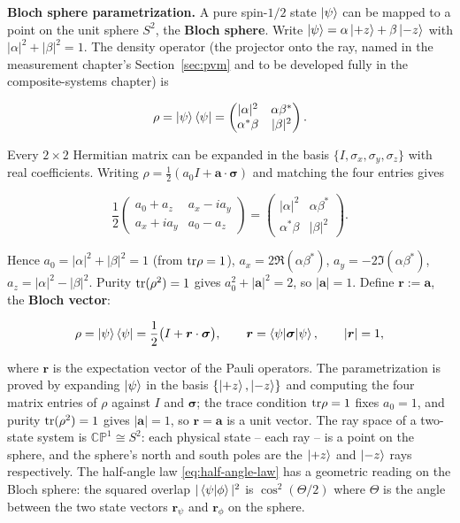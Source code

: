 \medskip\noindent\textbf{Bloch sphere parametrization.}
A pure spin-$1/2$ state $\ket{\psi}$ can be mapped to a point on the unit sphere $S^2$, the \textbf{Bloch sphere}. Write $\ket{\psi} = \alpha\ket{+z} + \beta\ket{-z}$ with $|\alpha|^2+|\beta|^2=1$. The density operator (the projector onto the ray, named in the measurement chapter's Section~\ref{sec:pvm} and to be developed fully in the composite-systems chapter) is
\begin{linenomath}
\begin{equation*}
\rho = \ket{\psi}\bra{\psi}
= \begin{pmatrix}
    |\alpha|^2 & \alpha\beta^* \\
    \alpha^*\beta & |\beta|^2
  \end{pmatrix}.
\end{equation*}
\end{linenomath}
Every $2\times2$ Hermitian matrix can be expanded in the basis $\{I,\sigma_x,\sigma_y,\sigma_z\}$ with real coefficients. Writing $\rho = \frac12(a_0 I + \bm a\cdot\bm\sigma)$ and matching the four entries gives
\begin{linenomath}
\begin{equation*}
\frac12\begin{pmatrix} a_0 + a_z & a_x - i a_y \\ a_x + i a_y & a_0 - a_z \end{pmatrix}
= \begin{pmatrix} |\alpha|^2 & \alpha\beta^* \\ \alpha^*\beta & |\beta|^2 \end{pmatrix}.
\end{equation*}
\end{linenomath}
Hence $a_0 = |\alpha|^2+|\beta|^2 = 1$ (from $\mathrm{tr}\rho=1$), $a_x = 2\Re(\alpha\beta^*)$, $a_y = -2\Im(\alpha\beta^*)$, $a_z = |\alpha|^2-|\beta|^2$. Purity $\mathrm{tr}(\rho^2)=1$ gives $a_0^2 + |\bm a|^2 = 2$, so $|\bm a|=1$. Define $\bm r := \bm a$, the \textbf{Bloch vector}:
\begin{linenomath}
  \begin{equation}
    \rho = \ket{\psi}\bra{\psi} = \frac12\bigl(I + \bm r\cdot\bm\sigma\bigr),
    \qquad
    \bm r = \braket{\psi|\bm\sigma|\psi},
    \qquad
    |\bm r| = 1,
    \label{eq:bloch-vector}
  \end{equation}
\end{linenomath}
where $\bm r$ is the expectation vector of the Pauli operators. The parametrization is proved by expanding $\ket{\psi}$ in the basis $\{\ket{+z},\ket{-z}\}$ and computing the four matrix entries of $\rho$ against $I$ and $\bm\sigma$; the trace condition $\mathrm{tr}\rho=1$ fixes $a_0=1$, and purity $\mathrm{tr}(\rho^2)=1$ gives $|\bm a|=1$, so $\bm r = \bm a$ is a unit vector. The ray space of a two-state system is $\mathbb{CP}^1 \cong S^2$: each physical state -- each ray -- is a point on the sphere, and the sphere's north and south poles are the $\ket{+z}$ and $\ket{-z}$ rays respectively. The half-angle law \eqref{eq:half-angle-law} has a geometric reading on the Bloch sphere: the squared overlap $|\braket{\psi|\phi}|^2$ is $\cos^2(\Theta/2)$ where $\Theta$ is the angle between the two state vectors $\bm r_\psi$ and $\bm r_\phi$ on the sphere.

